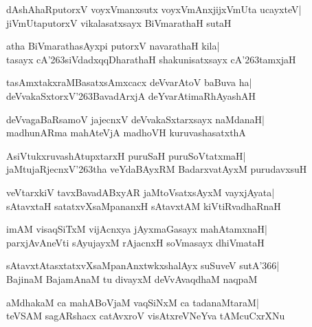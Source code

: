 \documentclass[twoside,12pt,openright]{book}
\def\S{\char'263}
\newcounter{shloka}[chapter]
\begin{document}
\begin{shloka}%
dAshAhaRputorxV voyxVmanxsutx voyxVmAnxjijxVmUta ucayxteV|\\
jiVmUtaputorxV vikalasatxsayx BiVmarathaH sutaH
\end{shloka}

\begin{shloka}%
atha BiVmarathasAyxpi putorxV navarathaH kila|\\
tasayx cA\S siVdadxqqDharathaH shakunisatxsayx cA\S tamxjaH
\end{shloka}

\begin{shloka}%
tasAmxtakxraMBasatxsAmxcacx deVvarAtoV baBuva ha|\\
deVvakaSxtorxV\S BavadArxjA deYvarAtimaRhAyashAH
\end{shloka}

\begin{shloka}%
deVvagaBaRsamoV jajecnxV deVvakaSxtarxsayx naMdanaH|\\
madhunARma mahAteVjA madhoVH kuruvashasatxthA
\end{shloka}

\begin{shloka}%
AsiVtukxruvashAtupxtarxH puruSaH puruSoVtatxmaH|\\
jaMtujaRjecnxV\S tha veYdaBAyxRM BadarxvatAyxM purudavxsuH
\end{shloka}

\begin{shloka}%
veVtarxkiV tavxBavadABxyAR jaMtoVsatxsAyxM vayxjAyata|\\
sAtavxtaH satatxvXsaMpananxH sAtavxtAM kiVtiRvadhaRnaH
\end{shloka}

\begin{shloka}%
imAM visaqSiTxM vijAcnxya jAyxmaGasayx mahAtamxnaH|\\
parxjAvAneVti sAyujayxM rAjacnxH soVmasayx dhiVmataH
\end{shloka}

\begin{shloka}%
sAtavxtAtasxtatxvXsaMpanAnxtwkxshalAyx suSuveV sutA\char'366|\\
BajinaM BajamAnaM tu divayxM deVvAvaqdhaM naqpaM
\end{shloka}

\begin{shloka}%
aMdhakaM ca mahABoVjaM vaqSiNxM ca tadanaMtaraM|\\
teVSAM sagARshacx catAvxroV visAtxreVNeYva tAMcuCxrXNu
\end{shloka}
\end{document}
